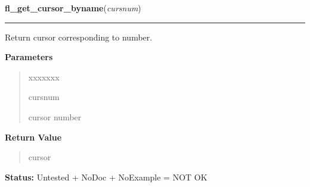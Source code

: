 \hspace{.8\funcindent}\begin{boxedminipage}{\funcwidth}

    \raggedright \textbf{fl\_get\_cursor\_byname}(\textit{cursnum})

    \vspace{-1.5ex}

    \rule{\textwidth}{0.5\fboxrule}
\setlength{\parskip}{2ex}
    Return cursor corresponding to number.

\setlength{\parskip}{1ex}
      \textbf{Parameters}
      \vspace{-1ex}

      \begin{quote}
        \begin{Ventry}{xxxxxxx}

          \item[cursnum]

          cursor number

        \end{Ventry}

      \end{quote}

      \textbf{Return Value}
    \vspace{-1ex}

      \begin{quote}
      cursor

      \end{quote}

\textbf{Status:} Untested + NoDoc + NoExample = NOT OK



    \end{boxedminipage}

    \label{xformslib:library:fl_reset_cursor}

    \vspace{0.5ex}

